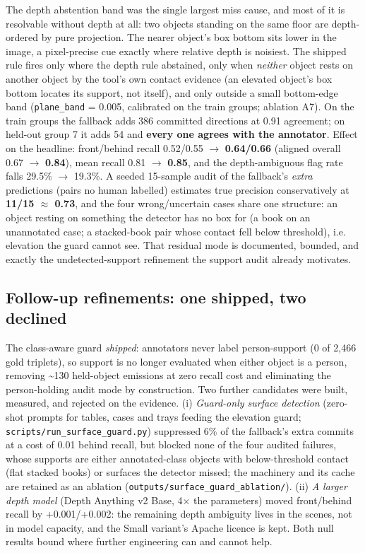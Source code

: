 The depth abstention band was the single largest miss cause, and most of it is resolvable without depth at all: two objects standing on the same floor are depth-ordered by pure projection. The nearer object's box bottom sits lower in the image, a pixel-precise cue exactly where relative depth is noisiest. The shipped rule fires only where the depth rule abstained, only when \textit{neither} object rests on another object by the tool's own contact evidence (an elevated object's box bottom locates its support, not itself), and only outside a small bottom-edge band (\texttt{plane\_band} = 0.005, calibrated on the train groups; ablation A7). On the train groups the fallback adds 386 committed directions at 0.91 agreement; on held-out group 7 it adds 54 and \textbf{every one agrees with the annotator}. Effect on the headline: front/behind recall 0.52/0.55 $\rightarrow$ \textbf{0.64/0.66} (aligned overall 0.67 $\rightarrow$ \textbf{0.84}), mean recall 0.81 $\rightarrow$ \textbf{0.85}, and the depth-ambiguous flag rate falls 29.5\% $\rightarrow$ 19.3\%. A seeded 15-sample audit of the fallback's \textit{extra} predictions (pairs no human labelled) estimates true precision conservatively at \textbf{11/15 $\approx$ 0.73}, and the four wrong/uncertain cases share one structure: an object resting on something the detector has no box for (a book on an unannotated case; a stacked-book pair whose contact fell below threshold), i.e. elevation the guard cannot see. That residual mode is documented, bounded, and exactly the undetected-support refinement the support audit already motivates.

\subsection{Follow-up refinements: one shipped, two declined}

The class-aware guard \textit{shipped}: annotators never label person-support (0 of 2,466 gold triplets), so support is no longer evaluated when either object is a person, removing \textasciitilde{}130 held-object emissions at zero recall cost and eliminating the person-holding audit mode by construction. Two further candidates were built, measured, and rejected on the evidence. (i) \textit{Guard-only surface detection} (zero-shot prompts for tables, cases and trays feeding the elevation guard; \texttt{scripts/run\_surface\_guard.py}) suppressed 6\% of the fallback's extra commits at a cost of 0.01 behind recall, but blocked none of the four audited failures, whose supports are either annotated-class objects with below-threshold contact (flat stacked books) or surfaces the detector missed; the machinery and its cache are retained as an ablation (\texttt{outputs/surface\_guard\_ablation/}). (ii) \textit{A larger depth model} (Depth Anything v2 Base, 4$\times$ the parameters) moved front/behind recall by +0.001/+0.002: the remaining depth ambiguity lives in the scenes, not in model capacity, and the Small variant's Apache licence is kept. Both null results bound where further engineering can and cannot help.

